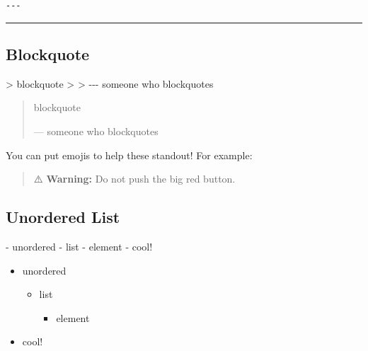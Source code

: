 \documentclass[
]{book}
\newenvironment{Shaded}{\begin{snugshade}}{\end{snugshade}}
\newcommand{\AttributeTok}[1]{\textcolor[rgb]{0.13,0.29,0.53}{#1}}
\newcommand{\NormalTok}[1]{#1}
\newcommand{\SpecialStringTok}[1]{\textcolor[rgb]{0.31,0.60,0.02}{#1}}
\providecommand{\tightlist}{%
  \setlength{\itemsep}{0pt}\setlength{\parskip}{0pt}}
\theoremstyle{definition}
\theoremstyle{definition}
\theoremstyle{definition}
\theoremstyle{definition}
\theoremstyle{remark}
\begin{document}
\begin{verbatim}
---
\end{verbatim}

\begin{center}\rule{0.5\linewidth}{0.5pt}\end{center}

\subsection*{Blockquote}\label{blockquote}

\begin{Shaded}
\begin{Highlighting}[]
\AttributeTok{\textgreater{} blockquote}
\AttributeTok{\textgreater{}}
\AttributeTok{\textgreater{} {-}{-}{-} someone who blockquotes}
\end{Highlighting}
\end{Shaded}

\begin{quote}
blockquote

--- someone who blockquotes
\end{quote}

You can put emojis to help these standout! For example:

\begin{quote}
⚠️ \textbf{Warning:} Do not push the big red button.
\end{quote}

\subsection*{Unordered List}\label{unordered-list}

\begin{Shaded}
\begin{Highlighting}[]
\SpecialStringTok{{-} }\NormalTok{unordered}
\SpecialStringTok{  {-} }\NormalTok{list}
\SpecialStringTok{    {-} }\NormalTok{element}
\SpecialStringTok{{-} }\NormalTok{cool!}
\end{Highlighting}
\end{Shaded}

\begin{itemize}
\tightlist
\item
  unordered

  \begin{itemize}
  \tightlist
  \item
    list

    \begin{itemize}
    \tightlist
    \item
      element
    \end{itemize}
  \end{itemize}
\item
  cool!
\end{itemize}
\end{document}
